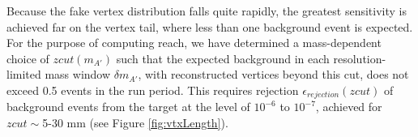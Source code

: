 


Because the fake vertex distribution falls quite rapidly, the greatest sensitivity is achieved far 
on the vertex tail, where less than one background event is expected.  For the purpose of 
computing reach, we have determined a mass-dependent choice of $zcut(m_{A'})$ such that the 
expected background in each resolution-limited mass window $\delta m_{A'}$, with reconstructed 
vertices beyond this cut, does not exceed 0.5 events in the run period.  
This requires rejection $\epsilon_{rejection} (zcut)$ of background events from the target at 
the level of $10^{-6}$ to $10^{-7}$, achieved for $zcut \sim$5-30 mm (see Figure \ref{fig:vtxLength}). 


